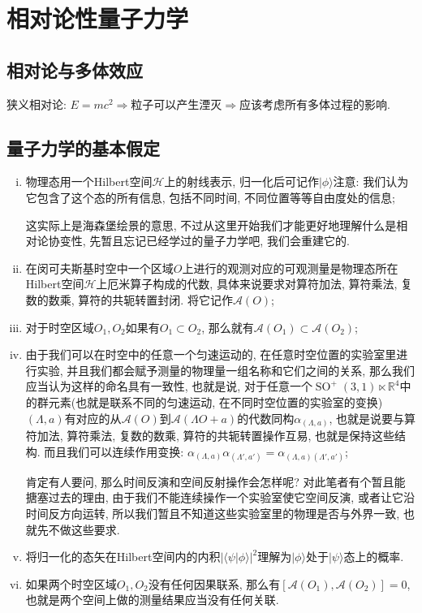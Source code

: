 \ifx\ALL\undefined


\maketitle
\setcounter{chapter}{0}
\fi

\chapter{相对论性量子力学}
\section{相对论与多体效应}
狭义相对论: $E=mc^2$$\Rightarrow$粒子可以产生湮灭$\Rightarrow$应该考虑所有多体过程的影响.
\section{量子力学的基本假定}
\begin{enumerate}[(i)]
    \item 物理态用一个Hilbert空间$\mathcal{H}$上的射线表示, 归一化后可记作$|\phi\rangle$注意: 我们认为它包含了这个态的所有信息, 包括不同时间, 不同位置等等自由度处的信息;
        \begin{remark}
            这实际上是海森堡绘景的意思, 不过从这里开始我们才能更好地理解什么是相对论协变性, 先暂且忘记已经学过的量子力学吧, 我们会重建它的.
        \end{remark}
    \item 在闵可夫斯基时空中一个区域$O$上进行的观测对应的可观测量是物理态所在Hilbert空间$\mathcal{H}$上厄米算子构成的代数, 具体来说要求对算符加法, 算符乘法, 复数的数乘, 算符的共轭转置封闭. 将它记作$\mathcal{A}(O)$;
    \item 对于时空区域$O_1, O_2$如果有$O_1\subset O_2$, 那么就有$\mathcal{A}(O_1)\subset \mathcal{A}(O_2)$;
    \item 由于我们可以在时空中的任意一个匀速运动的, 在任意时空位置的实验室里进行实验, 并且我们都会赋予测量的物理量一组名称和它们之间的关系, 那么我们应当认为这样的命名具有一致性, 也就是说, 对于任意一个$\operatorname{SO}^+(3, 1)\ltimes\mathbb{R}^4$中的群元素(也就是联系不同的匀速运动, 在不同时空位置的实验室的变换)$(\Lambda, a)$有对应的从$\mathcal{A}(O)$到$\mathcal{A}(\Lambda O+a)$的代数同构$\alpha_{(\Lambda, a)}$, 也就是说要与算符加法, 算符乘法, 复数的数乘, 算符的共轭转置操作互易, 也就是保持这些结构. 而且我们可以连续作用变换: $\alpha_{(\Lambda, a)}\alpha_{(\Lambda', a')}=\alpha_{(\Lambda, a)(\Lambda', a')}$;
        \begin{remark}
            肯定有人要问, 那么时间反演和空间反射操作会怎样呢? 对此笔者有个暂且能搪塞过去的理由, 由于我们不能连续操作一个实验室使它空间反演, 或者让它沿时间反方向运转, 所以我们暂且不知道这些实验室里的物理是否与外界一致, 也就先不做这些要求.
        \end{remark}
    \item 将归一化的态矢在Hilbert空间内的内积$|\langle\psi|\phi\rangle|^2$理解为$|\phi\rangle$处于$|\psi\rangle$态上的概率.
    \item 如果两个时空区域$O_1, O_2$没有任何因果联系, 那么有$[\mathcal{A}(O_1), \mathcal{A}(O_2)]=0$, 也就是两个空间上做的测量结果应当没有任何关联.
\end{enumerate}\par
